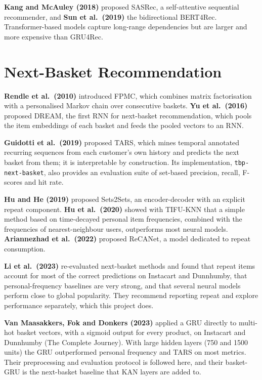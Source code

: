 \textbf{Kang and McAuley (2018)} \cite{kang2018} proposed SASRec, a
self-attentive sequential recommender, and \textbf{Sun et al.\ (2019)}
\cite{sun2019} the bidirectional BERT4Rec. Transformer-based models capture
long-range dependencies but are larger and more expensive than GRU4Rec.

\section{Next-Basket Recommendation}

\textbf{Rendle et al.\ (2010)} \cite{rendle2010} introduced FPMC, which combines
matrix factorisation with a personalised Markov chain over consecutive baskets.
\textbf{Yu et al.\ (2016)} \cite{yu2016} proposed DREAM, the first RNN for
next-basket recommendation, which pools the item embeddings of each basket and
feeds the pooled vectors to an RNN.

\textbf{Guidotti et al.\ (2019)} \cite{guidotti2019} proposed TARS, which mines
temporal annotated recurring sequences from each customer's own history and
predicts the next basket from them; it is interpretable by construction. Its
implementation, \texttt{tbp-next-basket}, also provides an evaluation suite of
set-based precision, recall, F-scores and hit rate.

\textbf{Hu and He (2019)} \cite{hu2019} proposed Sets2Sets, an encoder-decoder
with an explicit repeat component. \textbf{Hu et al.\ (2020)} \cite{hu2020}
showed with TIFU-KNN that a simple method based on time-decayed personal item
frequencies, combined with the frequencies of nearest-neighbour users,
outperforms most neural models. \textbf{Ariannezhad et al.\ (2022)}
\cite{ariannezhad2022} proposed ReCANet, a model dedicated to repeat
consumption.

\textbf{Li et al.\ (2023)} \cite{li2023} re-evaluated next-basket methods and
found that repeat items account for most of the correct predictions on Instacart
and Dunnhumby, that personal-frequency baselines are very strong, and that
several neural models perform close to global popularity. They recommend
reporting repeat and explore performance separately, which this project does.

\textbf{Van Maasakkers, Fok and Donkers (2023)} \cite{vanmaasakkers2023} applied
a GRU directly to multi-hot basket vectors, with a sigmoid output for every
product, on Instacart and Dunnhumby (The Complete Journey). With large hidden
layers (750 and 1500 units) the GRU outperformed personal frequency and TARS on
most metrics. Their preprocessing and evaluation protocol is followed here, and
their basket-GRU is the next-basket baseline that KAN layers are added to.

